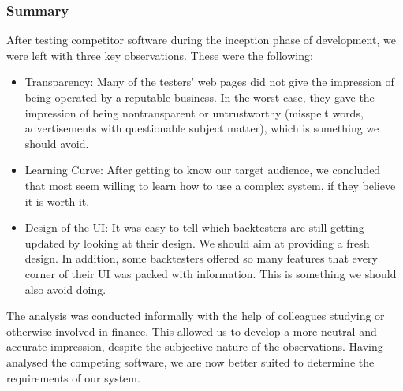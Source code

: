 \documentclass[main.tex]{subfiles}
\begin{document}
\subsubsection{Summary}
\label{reliability}

After testing competitor software during the inception phase of development, we were left with three key observations. These were the following:

\begin{itemize}
    \item Transparency: Many of the testers' web pages did not give the impression of being operated by a reputable business. In the worst case, they gave the impression of being nontransparent or untrustworthy (misspelt words, advertisements with questionable subject matter), which is something we should avoid.
    \item Learning Curve: After getting to know our target audience, we concluded that most seem willing to learn how to use a complex system, if they believe it is worth it.
    \item Design of the UI: It was easy to tell which backtesters are still getting updated by looking at their design. We should aim at providing a fresh design. In addition, some backtesters offered so many features that every corner of their UI was packed with information. This is something we should also avoid doing.
    
\end{itemize}

The analysis was conducted informally with the help of colleagues studying or otherwise involved in finance. This allowed us to develop a more neutral and accurate impression, despite the subjective nature of the observations. Having analysed the competing software, we are now better suited to determine the requirements of our system. 
\end{document}
